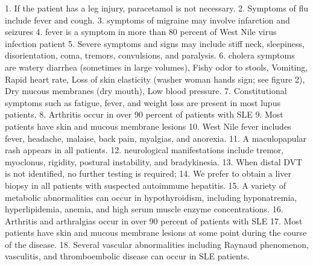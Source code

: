 1. If the patient has a leg injury, paracetamol is not necessary.
2. Symptoms of flu include fever and cough.
3. symptoms of migraine may involve infarction and seizures
4. fever is a symptom in more than 80 percent of West Nile virus infection patient
5. Severe symptoms and signs may include stiff neck, sleepiness, disorientation, coma, tremors, convulsions, and paralysis.
6. cholera symptoms are watery diarrhea (sometimes in large volumes), Fishy odor to stools, Vomiting, Rapid heart rate, Loss of skin elasticity (washer woman hands sign; see figure 2), Dry mucous membranes (dry mouth), Low blood pressure.
7. Constitutional symptoms such as fatigue, fever, and weight loss are present in most lupus patients.
8. Arthritis occur in over 90 percent of patients with SLE
9. Most patients have skin and mucous membrane lesions 
10. West Nile fever includes fever, headache, malaise, back pain, myalgias, and anorexia.
11. A maculopapular rash appears in all patients.
12. neurological manifestations include tremor, myoclonus, rigidity, postural instability, and bradykinesia.
13. When distal DVT is not identified, no further testing is required;
14. We prefer to obtain a liver biopsy in all patients with suspected autoimmune hepatitis.
15. A variety of metabolic abnormalities can occur in hypothyroidism, including hyponatremia, hyperlipidemia, anemia, and high serum muscle enzyme concentrations.
16. Arthritis and arthralgias occur in over 90 percent of patients with SLE
17. Most patients have skin and mucous membrane lesions at some point during the course of the disease.
18. Several vascular abnormalities including Raynaud phenomenon, vasculitis, and thromboembolic disease can occur in SLE patients.
